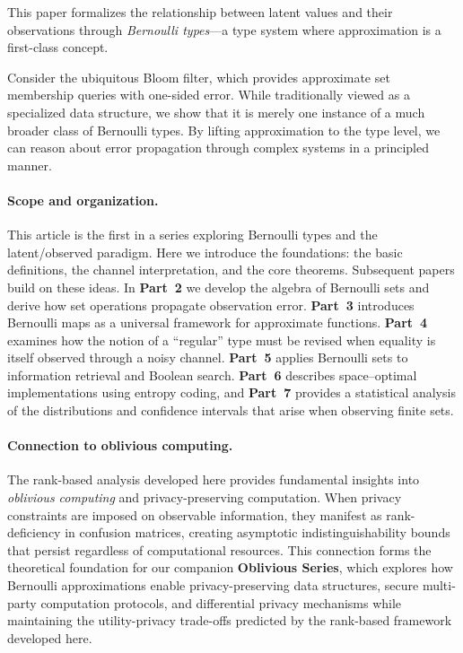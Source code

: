 \documentclass[11pt,final,hidelinks]{article}
\begin{document}
This paper formalizes the relationship between latent values and their observations through \emph{Bernoulli types}—a type system where approximation is a first-class concept.

Consider the ubiquitous Bloom filter, which provides approximate set membership queries with one-sided error. While traditionally viewed as a specialized data structure, we show that it is merely one instance of a much broader class of Bernoulli types. By lifting approximation to the type level, we can reason about error propagation through complex systems in a principled manner.

\paragraph{Scope and organization.}  This article is the first in a series exploring Bernoulli types and the latent/observed paradigm.  Here we introduce the foundations: the basic definitions, the channel interpretation, and the core theorems.  Subsequent papers build on these ideas.  In \textbf{Part~2} we develop the algebra of Bernoulli sets and derive how set operations propagate observation error.  \textbf{Part~3} introduces Bernoulli maps as a universal framework for approximate functions.  \textbf{Part~4} examines how the notion of a ``regular'' type must be revised when equality is itself observed through a noisy channel.  \textbf{Part~5} applies Bernoulli sets to information retrieval and Boolean search.  \textbf{Part~6} describes space–optimal implementations using entropy coding, and \textbf{Part~7} provides a statistical analysis of the distributions and confidence intervals that arise when observing finite sets.

\paragraph{Connection to oblivious computing.} The rank-based analysis developed here provides fundamental insights into \emph{oblivious computing} and privacy-preserving computation. When privacy constraints are imposed on observable information, they manifest as rank-deficiency in confusion matrices, creating asymptotic indistinguishability bounds that persist regardless of computational resources. This connection forms the theoretical foundation for our companion \textbf{Oblivious Series}, which explores how Bernoulli approximations enable privacy-preserving data structures, secure multi-party computation protocols, and differential privacy mechanisms while maintaining the utility-privacy trade-offs predicted by the rank-based framework developed here.
\end{document}
